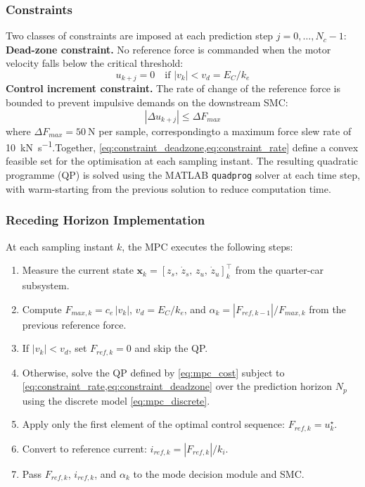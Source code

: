 \subsubsection{Constraints}\label{subsubsec:mpc_constraints}Two classes of constraints are imposed at each prediction step $j = 0, \ldots, N_c - 1 $: \newline
\textbf{Dead-zone constraint.} No reference force is commanded when the motor velocity falls below the critical threshold:\begin{equation}u_{k+j} = 0 \quad \text{if } |v_k| < v_d = E_C / k_e\label{eq:constraint_deadzone}\end{equation}\textbf{Control increment constraint.} The rate of change of the reference force is bounded to prevent impulsive demands on the downstream SMC:\begin{equation}|\Delta u_{k+j}| \leq \Delta F_{max}\label{eq:constraint_rate}\end{equation}where $\Delta F_{max} = \SI{50}{\newton}$ per sample, correspondingto a maximum force slew rate of \SI{10}{\kilo\newton\per\second}.Together, \cref{eq:constraint_deadzone,eq:constraint_rate} define a convex feasible set for the optimisation at each sampling instant. The resulting quadratic programme (QP) is solved using the MATLAB \texttt{quadprog} solver at each time step, with warm-starting from the previous solution to reduce computation time.
\subsubsection{Receding Horizon Implementation}
\label{subsubsec:mpc_receding}

At each sampling instant $k$, the MPC executes the following steps:

\begin{enumerate}
    \item Measure the current state $\bm{x}_k = [z_s,\,\dot{z}_s,\,z_u,\,\dot{z}_u]_k^\top$
          from the quarter-car subsystem.
    \item Compute $F_{max,k} = c_e\,|v_k|$, $v_d = E_C/k_e$, and
          $\alpha_k = |F_{ref,k-1}|/F_{max,k}$ from the previous
          reference force.
    \item If $|v_k| < v_d$, set $F_{ref,k} = 0$ and skip the QP.
    \item Otherwise, solve the QP defined by \cref{eq:mpc_cost}
          subject to \cref{eq:constraint_rate,eq:constraint_deadzone}
          over the prediction horizon $N_p$ using the discrete model
          \cref{eq:mpc_discrete}.
    \item Apply only the first element of the optimal control sequence:
          $F_{ref,k} = u_k^\star$.
    \item Convert to reference current: $i_{ref,k} = |F_{ref,k}|/k_i$.
    \item Pass $F_{ref,k}$, $i_{ref,k}$, and $\alpha_k$ to the mode
          decision module and SMC.
\end{enumerate}

